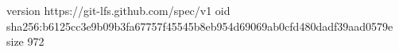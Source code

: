 version https://git-lfs.github.com/spec/v1
oid sha256:b6125cc3e9b09b3fa67757f45545b8eb954d69069ab0cfd480dadf39aad0579e
size 972
